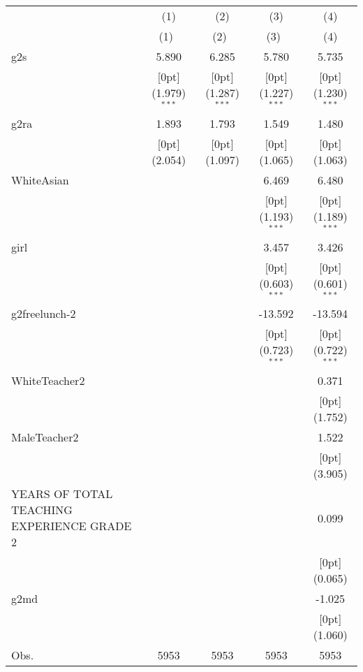 \begin{tabular*}{\textwidth}{@{\extracolsep{\fill}}lcccc}				
	& \multicolumn{1}{c}{(1)} &	\multicolumn{1}{c}{(2)} &	\multicolumn{1}{c}{(3)} &	\multicolumn{1}{c}{(4)} \\
\cline{2-5}				
	& \multicolumn{1}{c}{(1)\mbox{\ }} &	\multicolumn{1}{c}{(2)\mbox{\ }} &	\multicolumn{1}{c}{(3)\mbox{\ }} &	\multicolumn{1}{c}{(4)} \\
\hline				
g2s &	5.890 &	6.285 &	5.780 &	5.735 \\
&	\raisebox{.7ex}[0pt]{\scriptsize (1.979)$^{***}$} &	\raisebox{.7ex}[0pt]{\scriptsize (1.287)$^{***}$} &	\raisebox{.7ex}[0pt]{\scriptsize (1.227)$^{***}$} &	\raisebox{.7ex}[0pt]{\scriptsize (1.230)$^{***}$} \\
g2ra &	1.893 &	1.793 &	1.549 &	1.480 \\
&	\raisebox{.7ex}[0pt]{\scriptsize (2.054)} &	\raisebox{.7ex}[0pt]{\scriptsize (1.097)} &	\raisebox{.7ex}[0pt]{\scriptsize (1.065)} &	\raisebox{.7ex}[0pt]{\scriptsize (1.063)} \\
WhiteAsian &	&	&	6.469 &	6.480 \\
&	&	&	\raisebox{.7ex}[0pt]{\scriptsize (1.193)$^{***}$} &	\raisebox{.7ex}[0pt]{\scriptsize (1.189)$^{***}$} \\
girl &	&	&	3.457 &	3.426 \\
&	&	&	\raisebox{.7ex}[0pt]{\scriptsize (0.603)$^{***}$} &	\raisebox{.7ex}[0pt]{\scriptsize (0.601)$^{***}$} \\
g2freelunch-2 &	&	&	-13.592 &	-13.594 \\
&	&	&	\raisebox{.7ex}[0pt]{\scriptsize (0.723)$^{***}$} &	\raisebox{.7ex}[0pt]{\scriptsize (0.722)$^{***}$} \\
WhiteTeacher2 &	&	&	&	0.371 \\
&	&	&	&	\raisebox{.7ex}[0pt]{\scriptsize (1.752)} \\
MaleTeacher2 &	&	&	&	1.522 \\
&	&	&	&	\raisebox{.7ex}[0pt]{\scriptsize (3.905)} \\
YEARS OF TOTAL TEACHING EXPERIENCE GRADE 2 &	&	&	&	0.099 \\
&	&	&	&	\raisebox{.7ex}[0pt]{\scriptsize (0.065)} \\
g2md &	&	&	&	-1.025 \\
&	&	&	&	\raisebox{.7ex}[0pt]{\scriptsize (1.060)} \\
Obs. &	5953 &	5953 &	5953 &	5953 \\
\hline\hline				
\end{tabular*}%
